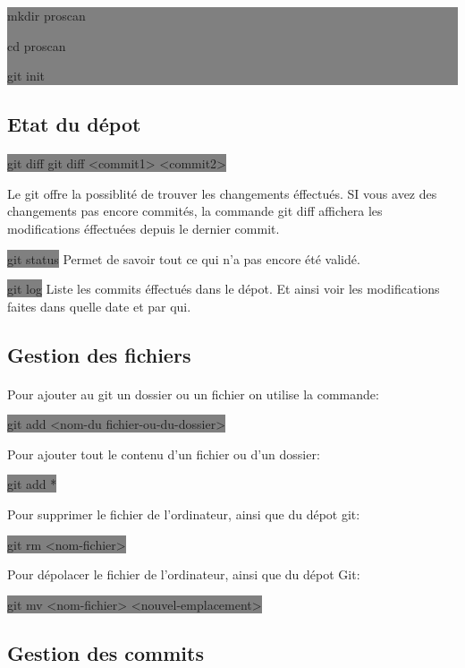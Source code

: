 \documentclass[11pt,a4paper,titlepage, oneside]{article}
\begin{document}
			\colorbox{gray}{mkdir proscan

				cd proscan
	
				git init}
	
	\subsection{{\color{blue} Etat du dépot}}	
		\paragraph{}
			\colorbox{gray}{git diff git diff <commit1> <commit2>}

			Le git offre la possiblité de trouver les changements éffectués. SI vous avez des changements pas encore commités, la commande git diff affichera les modifications éffectuées depuis le dernier commit.

			\colorbox{gray}{git status} Permet de savoir tout ce qui n'a pas encore été validé.
	
			\colorbox{gray}{git log} Liste les commits éffectués dans le dépot. Et ainsi voir les modifications faites dans quelle date et par qui.

	\subsection{{\color{blue} Gestion des fichiers}}

		\paragraph{}
			Pour ajouter au git un dossier ou un fichier on utilise la commande:

			\colorbox{gray}{git add <nom-du fichier-ou-du-dossier>}

			Pour ajouter tout le contenu d'un fichier ou d'un dossier:

			\colorbox{gray}{git add *}

			Pour supprimer le fichier de l'ordinateur, ainsi que du dépot git:		
			
			\colorbox{gray}{git rm <nom-fichier>}

			Pour dépolacer le fichier de l'ordinateur, ainsi que du dépot Git:
			
			\colorbox{gray}{git mv <nom-fichier> <nouvel-emplacement>}

	\subsection{{\color{blue} Gestion des commits}}
\end{document}
